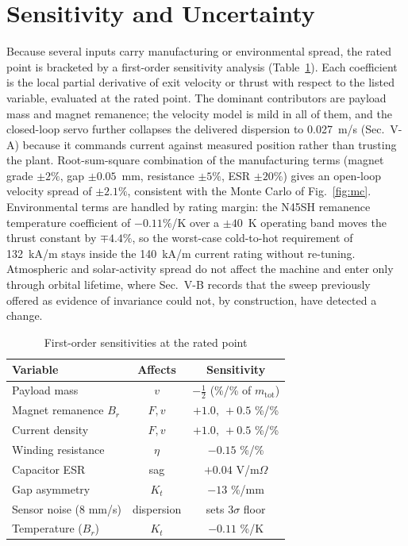 \documentclass[conference]{IEEEtran}
\begin{document}
\section{Sensitivity and Uncertainty}\label{sec:sens}
Because several inputs carry manufacturing or environmental spread, the rated point is bracketed by a first-order sensitivity analysis (Table~\ref{tab:sens}). Each coefficient is the local partial derivative of exit velocity or thrust with respect to the listed variable, evaluated at the rated point. The dominant contributors are payload mass and magnet remanence; the velocity model is mild in all of them, and the closed-loop servo further collapses the delivered dispersion to 0.027~m/s (Sec.~V-A) because it commands current against measured position rather than trusting the plant. Root-sum-square combination of the manufacturing terms (magnet grade $\pm2\%$, gap $\pm0.05$~mm, resistance $\pm5\%$, ESR $\pm20\%$) gives an open-loop velocity spread of $\pm2.1\%$, consistent with the Monte Carlo of Fig.~\ref{fig:mc}. Environmental terms are handled by rating margin: the N45SH remanence temperature coefficient of $-0.11\%$/K over a $\pm40$~K operating band moves the thrust constant by $\mp4.4\%$, so the worst-case cold-to-hot requirement of 132~kA/m stays inside the 140~kA/m current rating without re-tuning. Atmospheric and solar-activity spread do not affect the machine and enter only through orbital lifetime, where Sec.~V-B records that the sweep previously offered as evidence of invariance could not, by construction, have detected a change.

\begin{table}[t]
\caption{First-order sensitivities at the rated point}
\label{tab:sens}
\centering\footnotesize
\begin{tabular}{lcc}
\toprule
Variable & Affects & Sensitivity\\
\midrule
Payload mass & $v$ & $-\tfrac{1}{2}$ (\%/\% of $m_{\mathrm{tot}}$)\\
Magnet remanence $B_r$ & $F,v$ & $+1.0,\ +0.5$ \%/\%\\
Current density & $F,v$ & $+1.0,\ +0.5$ \%/\%\\
Winding resistance & $\eta$ & $-0.15$ \%/\%\\
Capacitor ESR & sag & $+0.04$ V/m$\Omega$\\
Gap asymmetry & $K_t$ & $-13$ \%/mm\\
Sensor noise (8 mm/s) & dispersion & sets 3$\sigma$ floor\\
Temperature ($B_r$) & $K_t$ & $-0.11$ \%/K\\
\bottomrule
\end{tabular}
\end{table}
\end{document}
